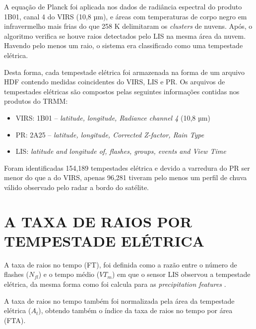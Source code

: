 A equação de Planck foi aplicada nos dados de radiância espectral do produto 1B01, canal 4 do VIRS (10,8 µm), e áreas com temperaturas de corpo negro em infravermelho mais frias do que 258 K delimitaram os \textit{clusters} de nuvens. Após, o algoritmo verifica se houve raios detectados pelo LIS na mesma área da nuvem. Havendo pelo menos um raio, o sistema era classificado como uma tempestade elétrica. 

Desta forma, cada tempestade elétrica foi armazenada na forma de um arquivo HDF contendo medidas coincidentes do VIRS, LIS e PR. Os arquivos de tempestades elétricas são compostos pelas seguintes informações contidas nos produtos do TRMM:

\begin{itemize}
\item VIRS: 1B01 -- \textit{latitude, longitude, Radiance channel 4} (10,8 µm)
\item PR: 2A25 -- \textit{latitude, longitude, Corrected Z-factor, Rain Type} 
\item LIS: \textit{latitude and longitude of, flashes, groups, events and View Time}  
\end{itemize} 

Foram identificadas 154,189 tempestades elétrica e devido a varredura do PR ser menor do que a do VIRS, apenas 96,281 tiveram pelo menos um perfil de chuva válido observado pelo radar a bordo do satélite.


\section{A TAXA DE RAIOS POR TEMPESTADE ELÉTRICA}

A taxa de raios no tempo (FT), foi definida como a razão entre o número de flashes ($N_{fl}$) e o tempo médio ($VT_m$) em que o sensor LIS observou a tempestade elétrica, da mesma forma como foi calcula para as \textit{precipitation features} \cite{cecil2005, Nesbitt2000}. 



A taxa de raios no tempo também foi normalizada pela área da tempestade elétrica ($A_t$), obtendo também o índice da taxa de raios no tempo por área (FTA). 

